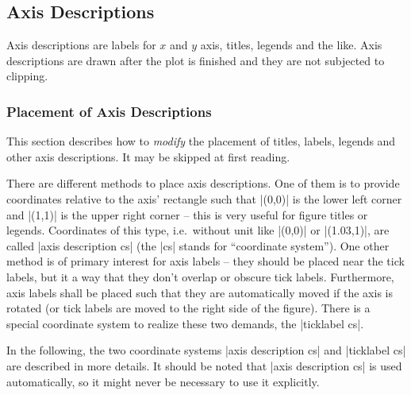 
\subsection{Axis Descriptions}
Axis descriptions are labels for $x$ and $y$ axis, titles, legends and the like. Axis descriptions are drawn after the plot is finished and they are not subjected to clipping. 

\subsubsection{Placement of Axis Descriptions}
This section describes how to \emph{modify} the placement of titles, labels, legends and other axis descriptions. It may be skipped at first reading.

There are different methods to place axis descriptions. One of them is to provide coordinates relative to the axis' rectangle such that |(0,0)| is the lower left corner and |(1,1)| is the upper right corner -- this is very useful for figure titles or legends. Coordinates of this type, i.e.\ without unit like |(0,0)| or |(1.03,1)|, are called |axis description cs| (the |cs| stands for ``coordinate system''). One other method is of primary interest for axis labels -- they should be placed near the tick labels, but it a way that they don't overlap or obscure tick labels. Furthermore, axis labels shall be placed such that they are automatically moved if the axis is rotated (or tick labels are moved to the right side of the figure). There is a special coordinate system to realize these two demands, the |ticklabel cs|.

In the following, the two coordinate systems |axis description cs| and |ticklabel cs| are described in more details. It should be noted that |axis description cs| is used automatically, so it might never be necessary to use it explicitly.



